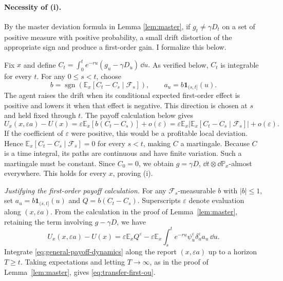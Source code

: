 \documentclass[12pt]{article}
\newcommand{\E}{\mathbb{E}}
\begin{document}
\paragraph{Necessity of (i).} 

By the master deviation formula in Lemma \ref{lem:master}, if $g_t \neq \gamma D_t$ on a set  of positive measure with positive probability, a small drift distortion of the appropriate sign and produce a first-order gain. I formalize this below.

Fix $x$ and define
\(
 C_t=\int_0^t e^{-ru}(g_u-\gamma D_u)\,\dd u.
\)
As verified below, $C_t$ is integrable for every $t$.
For any $0\leq s<t$, choose
\[
 b=\operatorname{sgn}\!\left(
       \E_x[C_t-C_s\mid\mathcal F_s]\right),
 \qquad
 a_u=b\mathbf1_{(s,t]}(u).
\]
The agent raises the drift when its conditional expected first-order
effect is positive and lowers it when that effect is negative.
This direction is chosen at $s$ and held fixed through $t$.
The payoff calculation below gives
\begin{equation*}
 U_x(x,\varepsilon a)-U(x)
 =\varepsilon\E_x[b(C_t-C_s)]+o(\varepsilon)
 =\varepsilon\E_x\left|
       \E_x[C_t-C_s\mid\mathcal F_s]\right|+o(\varepsilon).
\end{equation*}
If the coefficient of $\varepsilon$ were positive, this would be
a profitable local deviation. Hence
$\E_x[C_t-C_s\mid\mathcal F_s]=0$ for every $s<t$, making $C$
a martingale. Because $C$ is a time integral, its paths are
continuous and have finite variation. Such a martingale must be
constant. Since $C_0=0$, we obtain $g=\gamma D$,
$\dd t\otimes\dd\mathbb P_x$-almost everywhere.
This holds for every $x$, proving (i).

\emph{Justifying the first-order payoff calculation.}
For any $\mathcal F_s$-measurable $b$ with $|b|\leq1$, set
$a_u=b\mathbf1_{(s,t]}(u)$ and $Q=b(C_t-C_s)$.
Superscripts $\varepsilon$ denote evaluation along
$(x,\varepsilon a)$. From the calculation in the proof of Lemma~\ref{lem:master}, retaining
the term involving $g-\gamma D$, we have
\begin{equation}\label{eq:transfer-first-ou}
 U_x(x,\varepsilon a)-U(x)
 =\varepsilon\E_xQ^\varepsilon
 -\varepsilon\E_x\int_s^t e^{-ru}\psi_u^\varepsilon
                         \delta_u^\varepsilon a_u\,\dd u.
\end{equation}
 Integrate \eqref{eq:general-payoff-dynamics} along the report
$(x,\varepsilon a)$ up to a horizon $T\geq t$.
Taking expectations and letting $T\to\infty$, as in the proof
of Lemma~\ref{lem:master}, gives \eqref{eq:transfer-first-ou}.
\end{document}
